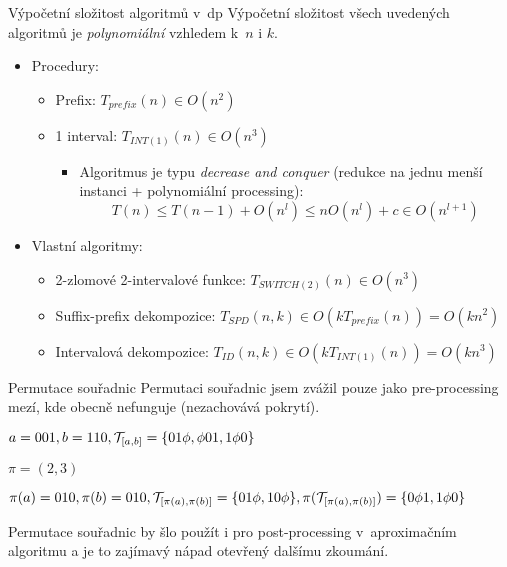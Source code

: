 \documentclass{beamer}
\theoremstyle{remark}
\begin{document}
\begin{frame}{Výpočetní složitost algoritmů v~\acrshort{dp}}
Výpočetní složitost všech uvedených algoritmů je \emph{polynomiální} vzhledem k~$n$ i $k$.

\begin{itemize}
\item Procedury:
\begin{itemize}
\item Prefix: $T_{prefix}(n) \in O(n^2)$
\item 1 interval: $T_{INT(1)}(n) \in O(n^3)$
\begin{itemize}
\item
Algoritmus je typu \emph{decrease and conquer} (redukce na jednu menší instanci + polynomiální processing):
$$T(n) \leq T(n-1) + O(n^l) \leq n O(n^l) + c \in O(n^{l+1})$$
\end{itemize}
\end{itemize}
\item Vlastní algoritmy:
\begin{itemize}
\item 2-zlomové 2-intervalové funkce: $T_{SWITCH(2)}(n) \in O(n^3)$
\item Suffix-prefix dekompozice: $T_{SPD}(n, k) \in O(k T_{prefix}(n)) = O(kn^2)$
\item Intervalová dekompozice: $T_{ID}(n, k) \in O(k T_{INT(1)}(n)) = O(k n^3)$
\end{itemize}
\end{itemize}

\end{frame}


\begin{frame}{Permutace souřadnic}
Permutaci souřadnic jsem zvážil pouze jako pre-processing mezí, kde obecně nefunguje (nezachovává pokrytí).

\begin{example}
$a = 001, b = 110, \mathcal{T}_{[a, b]} = \{01 \phi, \phi 01, 1 \phi 0\}$

$\pi = (2,3)$

$\pi(a) = 010, \pi(b) = 010,
\mathcal{T}_{[\pi(a), \pi(b)]} = \{01 \phi, 10 \phi\},
\pi(\mathcal{T}_{[\pi(a), \pi(b)]}) = \{0 \phi 1, 1 \phi 0\}$
\end{example}

Permutace souřadnic by šlo použít i pro post-processing v~aproximačním algoritmu a je to zajímavý nápad otevřený dalšímu zkoumání.

\end{frame}
\end{document}
